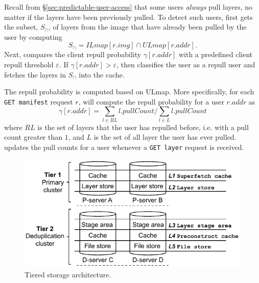 Recall from \S\ref{sec:predictable-user-access} that some users \emph{always} pull
layers, no matter if the layers have been previously pulled. To detect such users,
\sysname first gets the subset, $S_{\cap}$, of layers from the image that have already
been pulled by the user by computing
%
\begin{equation*}
S_{\cap} = ILmap[r.img] \cap ULmap[r.addr].
\end{equation*}
%
Next,  \sysname compares the client repull probability 
$\gamma[r.addr]$ with a predefined client repull threshold $\varepsilon$.
If $\gamma[r.addr] > \varepsilon$, then \sysname classifies the user as a repull user
and fetches the layers in $S_{\cap}$ into the cache.
%

The repull probability is computed based on ULmap. More specifically, for each
\texttt{GET manifest} request $r$, \sysname will compute the repull probability for a user
$r.addr$ as
\begin{equation*}
\gamma[r.addr] = \sum_{l \in RL} l.pullCount /  \sum_{l \in L} l.pullCount
\end{equation*}
where $RL$ is the set of layers that the user has repulled before, i.e. with a pull count greater
than $1$, and $L$ is the set of all layer the user has ever pulled. \sysname updates the pull
counts for a user whenever a \texttt{GET layer} request is received.
%

\begin{figure}[t]
	\centering
	\centering
	\includegraphics[width=\columnwidth]{graphs/sift-cache-bigger.pdf}
	\caption{Tiered storage architecture.}
	\label{fig:tieredstore}
\end{figure} 

